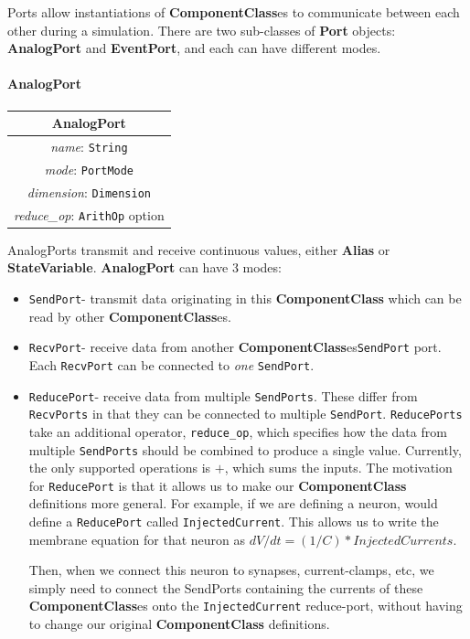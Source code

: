 \documentclass{article}
\newcommand{\nmlClass}[1]{{\bf #1}}
\newcommand{\ComponentClass}{{\bf{ComponentClass}}\xspace}
\newcommand{\ComponentClasses}{{\bf{ComponentClass}}es\xspace}
\newcommand{\StateVariable}{{\bf{StateVariable}}\xspace}
\newcommand{\Alias}{{\bf{Alias}}\xspace}
\newcommand{\AnalogPort}{{\bf{AnalogPort}}\xspace}
\newcommand{\SendPort}{{\tt{SendPort}}\xspace}
\newcommand{\RecvPort}{{\tt{RecvPort}}\xspace}
\newcommand{\ReducePort}{{\tt{ReducePort}}\xspace}
\newcommand{\SendPorts}{{\tt{SendPorts}}\xspace}
\newcommand{\RecvPorts}{{\tt{RecvPorts}}\xspace}
\newcommand{\ReducePorts}{{\tt{ReducePorts}}\xspace}
\begin{document}
Ports allow instantiations of \ComponentClasses to communicate between each
other during a simulation.
There are two sub-classes of \nmlClass{Port} objects: \nmlClass{AnalogPort}
and \nmlClass{EventPort}, and each can have different modes.

\paragraph{AnalogPort}


\begin{table}[htb]
\center
\begin{tabular}{|c|}
\hline
\hline
AnalogPort \\
\hline
\hline
{\em name}: {\tt String} \\
\hline
{\em mode}: {\tt PortMode} \\
\hline
{\em dimension}: {\tt Dimension} \\
\hline
{\em reduce\_op}: {\tt ArithOp} option \\
\hline
\end{tabular}
\end{table}


AnalogPorts transmit and receive continuous values, either \Alias
or \StateVariable. \AnalogPort can have 3 modes:
\begin{itemize}
\item \SendPort - transmit data originating in this \ComponentClass which can
be read by other \ComponentClasses.
\item \RecvPort - receive data from another \ComponentClasses \SendPort
port. Each \RecvPort can be connected to \emph{one} \SendPort.
\item \ReducePort - receive data from multiple \SendPorts. These
differ from \RecvPorts in that they can be connected to multiple
\SendPort. \ReducePorts take an additional operator,
{\tt reduce\_op}, which specifies how the data from multiple \SendPorts
should be combined to produce a single value. Currently, the
only supported operations is $+$, which sums the inputs.
The motivation for \ReducePort is that it allows us to make our
\ComponentClass definitions more general. For example, if we are defining a
neuron, would define a \ReducePort called {\tt InjectedCurrent}.
This allows us to write the membrane equation for that neuron as
$dV/dt = (1/C) * InjectedCurrents$.

Then, when we connect this neuron to synapses, current-clamps, etc, we
simply need to connect the SendPorts containing the currents of these
\ComponentClasses onto the {\tt InjectedCurrent} reduce-port, without having
to change our original \ComponentClass definitions.
\end{itemize}
\end{document}

